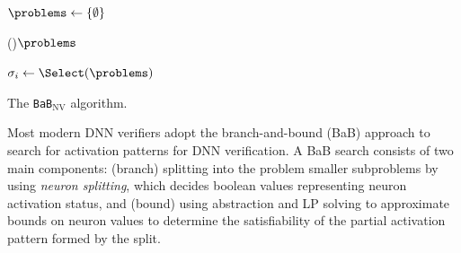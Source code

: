 \documentclass[oneside,11pt,dvipsnames]{book}
\newcommand{\bab}{\texttt{BaB$_{\text{NV}}$}}
\begin{document}



\begin{algorithm}[t]
    \footnotesize
    \BlankLine

    $\problems \leftarrow \{ \emptyset \}$  
    
    \While(){$\problems$}{\label{line:dpllstart}
        $\sigma_i \gets \Select(\problems)$ 
        
    }\label{line:dpllend}
    \Return{\unsat}
    
    \caption{The \bab{} algorithm.}\label{alg:bab}
\end{algorithm}

Most modern DNN verifiers adopt the branch-and-bound (BaB) approach to search for activation patterns for DNN verification. A BaB search consists of two main components: (branch) splitting into the problem smaller subproblems 
by using \emph{neuron splitting}, which decides boolean values representing neuron activation status, 
and (bound) using abstraction and LP solving to approximate bounds on neuron values to determine 
the satisfiability of the partial activation pattern formed by the split.
\end{document}
